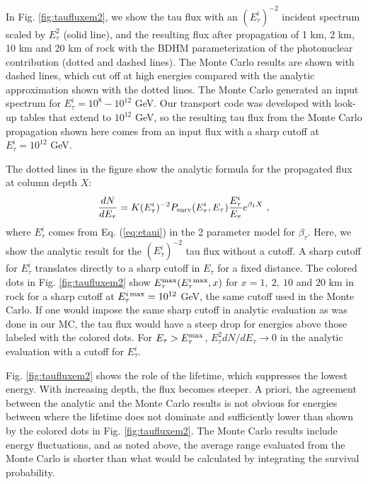 \documentclass[aps,10pt,twocolumn,tightenlines]{revtex4-1}
\begin{document}
In Fig. \ref{fig:taufluxem2}, we show the tau flux with an $(E_\tau^i)^{-2}$ incident spectrum scaled by $E_\tau^2$ (solid line), and the resulting
flux after propagation of 1 km, 2 km, 10 km and 20 km of rock with the BDHM 
parameterization of the photonuclear contribution (dotted and dashed lines). The Monte Carlo results are shown with dashed lines, which cut off at high energies compared with the analytic approximation
shown with the dotted lines.
The Monte Carlo generated an input spectrum for $E_\tau^i=10^8-10^{12}$
GeV. Our transport code was developed with look-up tables that extend to $10^{12}$ GeV, so the resulting tau flux from the Monte Carlo propagation shown here comes
from an input flux with
a sharp cutoff at $E_\tau^i=10^{12}$ GeV. 



The dotted lines in the figure show the analytic formula for the propagated flux at column depth $X$:
\begin{equation}
\label{eq:tausurv}
\frac{dN}{dE_\tau} = K(E_\tau^i)^{-2}P_{\rm surv}(E_\tau^i,E_\tau)\frac{E_\tau^i}{E_\tau}
e^{\beta_1 X}\ ,
\end{equation}
where $E_\tau^i$ comes from Eq. (\ref{eq:etaui}) in the 2 parameter model for $\beta_\tau$. Here, we show the analytic result for the
$(E_\tau^i)^{-2}$ tau flux without a cutoff.  A sharp cutoff for $E_\tau^i$ translates directly to a sharp cutoff in $E_\tau$ for a fixed distance. The colored dots in Fig. \ref{fig:taufluxem2} show $E_\tau^{\rm max}(E_\tau^{i\,{\rm max}},x)$ for $x=1,\ 2,\ 10$ and 20 km in rock
for a sharp cutoff at $E_\tau^{i\, {\rm max}}=10^{12}$ GeV, 
the same cutoff used in the Monte Carlo. If one would impose the same 
sharp cutoff in analytic evaluation as was done in our 
MC, the tau flux would have 
a steep drop for energies above those labeled with the colored dots.
For $E_\tau>E_{\tau}^{\rm max}$, $E_\tau^2 dN/dE_\tau\to 0$ in the analytic evaluation with a cutoff for $E_\tau^i$.


Fig. \ref{fig:taufluxem2}  shows the role of the lifetime, which suppresses the lowest energy. With increasing depth, the flux becomes steeper.
A priori, the agreement between the analytic and the Monte Carlo results is not obvious for energies between where the lifetime does not dominate and sufficiently lower than shown by the colored dots in Fig. \ref{fig:taufluxem2}. The Monte Carlo results include energy fluctuations, and as noted above, the average range evaluated from the Monte Carlo
is shorter than what would be calculated by integrating the survival probability.
\end{document}
